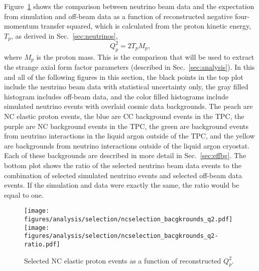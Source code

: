     Figure~\ref{fig:nceq2} shows the comparison between neutrino beam data and
    the expectation from simulation and off-beam data as a function of
    reconstructed negative four-momentum transfer squared, which is calculated
    from the proton kinetic energy, $T_p$, as derived in
    Sec.~\ref{sec:neutrinos},
    \begin{equation*}
      Q_p^2 = 2 T_p M_p,
    \end{equation*}
    where $M_p$ is the proton mass.  This is the comparison that will be used
    to extract the strange axial form factor parameters (described in
    Sec.~\ref{sec:analysis}). In this and all of the following figures in this
    section, the black points in the top plot include the neutrino beam data
    with statistical uncertainty only, the gray filled histogram includes
    off-beam data, and the color filled histograms include simulated neutrino
    events with overlaid cosmic data backgrounds. The peach are NC elastic
    proton events, the blue are CC background events in the TPC, the purple are
    NC background events in the TPC, the green are background events from
    neutrino interactions in the liquid argon outside of the TPC, and the
    yellow are backgrounds from neutrino interactions outside of the liquid
    argon cryostat. Each of these backgrounds are described in more detail in
    Sec.~\ref{sec:effbg}. The bottom plot shows the ratio of the selected
    neutrino beam data events to the combination of selected simulated neutrino
    events and selected off-beam data events. If the simulation and data were
    exactly the same, the ratio would be equal to one.
    
    \begin{figure}[ht]
      \centering
      \texttt{[image: figures/analysis/selection/ncselection\_bacgkrounds\_q2.pdf]} \\
      \texttt{[image: figures/analysis/selection/ncselection\_bacgkrounds\_q2-ratio.pdf]} \\
      \caption{Selected NC elastic proton events as a function of reconstructed $Q_p^2$.}
      \label{fig:nceq2}
    \end{figure}

